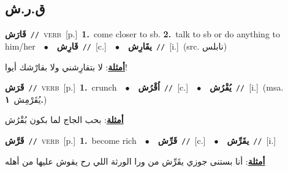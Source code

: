 \documentclass[10pt,a4paper,twoside]{article} %
\begin{document}
\begin{multicols}{2}
\vspace{-3mm}
\subsection*{\color{blue}\foreignlanguage{arabic}{ق.ر.ش}\color{blue}{}} 

{\setlength\topsep{0pt}\textbf{\foreignlanguage{arabic}{قَارَش}}\ {\color{gray}\texttt{//}\color{black}}\ \textsc{verb}\ [p.]\ \textbf{1.}~come closer to sb.  \textbf{2.}~talk to sb or do anything to him/her\ \ $\bullet$\ \ \setlength\topsep{0pt}\textbf{\foreignlanguage{arabic}{قَارِش}}\ {\color{gray}\texttt{//}\color{black}}\ [c.]\ \ $\bullet$\ \ \setlength\topsep{0pt}\textbf{\foreignlanguage{arabic}{يقَارِش}}\ {\color{gray}\texttt{//}\color{black}}\ [i.]\ (src. \color{gray}\foreignlanguage{arabic}{نابلس}\color{black})\  \begin{flushright}\color{gray}\foreignlanguage{arabic}{\textbf{\underline{\foreignlanguage{arabic}{أمثلة}}}: لا بتقارِشني ولا بقارْشك أيوا!}\end{flushright}\color{black}} \vspace{2mm}

{\setlength\topsep{0pt}\textbf{\foreignlanguage{arabic}{قَرَش}}\ {\color{gray}\texttt{//}\color{black}}\ \textsc{verb}\ [p.]\ \textbf{1.}~crunch\ \ $\bullet$\ \ \setlength\topsep{0pt}\textbf{\foreignlanguage{arabic}{اُقْرُش}}\ {\color{gray}\texttt{//}\color{black}}\ [c.]\ \ $\bullet$\ \ \setlength\topsep{0pt}\textbf{\foreignlanguage{arabic}{يُقْرُش}}\ {\color{gray}\texttt{//}\color{black}}\ [i.]\ \color{gray}(msa. \foreignlanguage{arabic}{يُقَرْمِش}~\foreignlanguage{arabic}{\textbf{١.}})\color{black}\  \begin{flushright}\color{gray}\foreignlanguage{arabic}{\textbf{\underline{\foreignlanguage{arabic}{أمثلة}}}: بحب الجاج لما بكون بُقْرُش}\end{flushright}\color{black}} \vspace{2mm}

{\setlength\topsep{0pt}\textbf{\foreignlanguage{arabic}{قَرَّش}}\ {\color{gray}\texttt{//}\color{black}}\ \textsc{verb}\ [p.]\ \textbf{1.}~become rich\ \ $\bullet$\ \ \setlength\topsep{0pt}\textbf{\foreignlanguage{arabic}{قَرِّش}}\ {\color{gray}\texttt{//}\color{black}}\ [c.]\ \ $\bullet$\ \ \setlength\topsep{0pt}\textbf{\foreignlanguage{arabic}{يقَرِّش}}\ {\color{gray}\texttt{//}\color{black}}\ [i.]\  \begin{flushright}\color{gray}\foreignlanguage{arabic}{\textbf{\underline{\foreignlanguage{arabic}{أمثلة}}}: أنا بستنى جوزي يقَرِّش من ورا الورثة اللي رح يقوش عليها من أهله}\end{flushright}\color{black}} \vspace{2mm}


\end{multicols}
\end{document}

